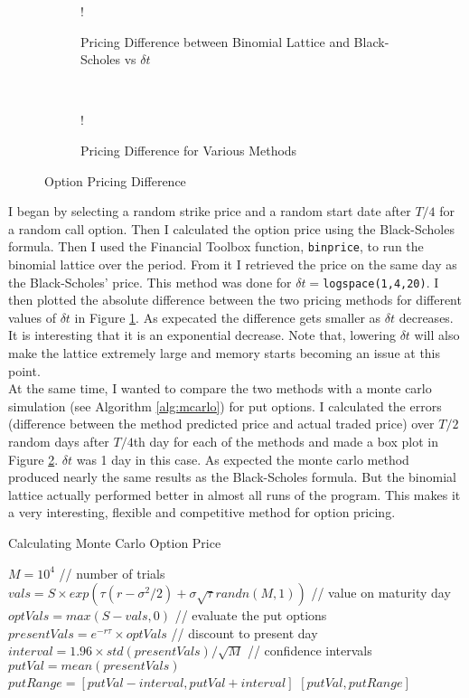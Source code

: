 \documentclass[11pt, fleqn]{article}
\let\oldReturn\Return
\renewcommand{\Return}{\State\oldReturn}
\begin{document}
\begin{figure}[!h]
   \centering 
   \begin{subfigure}[b]{0.45\textwidth}
     	\resizebox {\textwidth} {!} { }
		\caption{Pricing Difference between Binomial Lattice and Black-Scholes vs $\delta t$}
		\label{fig:q4-bls-vs-binomial}
    \end{subfigure}
    ~
    \begin{subfigure}[b]{0.44\textwidth}
       	\resizebox {\textwidth} {!} { }
		\caption{Pricing Difference for Various Methods}
        \label{fig:q4-bls-vs-binomial-vs-monte-error}
    \end{subfigure}
    \caption{Option Pricing Difference}
	\label{fig:pricing-difference}
\end{figure}

I began by selecting a random strike price and a random start date after $T/4$ for a random call option. Then I calculated the option price using the Black-Scholes formula. Then I used the Financial Toolbox function, \texttt{binprice}, to run the binomial lattice over the period. From it I retrieved the price on the same day as the Black-Scholes' price. This method was done for $\delta t = $\texttt{logspace(1,4,20)}. I then plotted the absolute difference between the two pricing methods for different values of $\delta t$ in Figure \ref{fig:q4-bls-vs-binomial}. As expecated the difference gets smaller as $\delta t$ decreases. It is interesting that it is an exponential decrease. Note that, lowering $\delta t$ will also make the lattice extremely large and memory starts becoming an issue at this point.\\

At the same time, I wanted to compare the two methods with a monte carlo simulation (see Algorithm \ref{alg:mcarlo}) for put options. I calculated the errors (difference between the method predicted price and actual traded price) over $T/2$ random days after $T/4$th day for each of the methods and made a box plot in Figure \ref{fig:q4-bls-vs-binomial-vs-monte-error}. $\delta t$ was 1 day in this case. As expected the monte carlo method produced nearly the same results as the Black-Scholes formula. But the binomial lattice actually performed better in almost all runs of the program. This makes it a very interesting, flexible and competitive method for option pricing.

\begin{algorithm}[H]
\caption{Calculating Monte Carlo Option Price}
\label{alg:mcarlo}
\begin{algorithmic}
\State $M = 10^4$ // number of trials
\State $vals=S\times exp(\tau(r-\sigma^2/2) + \sigma\sqrt{\tau}randn(M,1))$ // value on maturity day
\State $optVals=max(S-vals,0)$ // evaluate the put options
\State $presentVals=e^{-r\tau}\times optVals$ // discount to present day
\State $interval=1.96\times std(presentVals)/\sqrt{M}$ // confidence intervals
\State $putVal=mean(presentVals)$
\State $putRange = [putVal-interval, putVal+interval]$
\Return $[putVal,putRange]$
\EndFunction
\end{algorithmic}
\end{algorithm}
\end{document}
